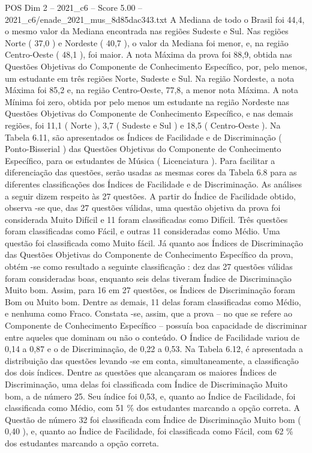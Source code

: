 \begin{textsample}{POS Dim 2 – 2021\_c6 – Score 5.00 – 2021\_c6/enade\_2021\_mus\_8d85dac343.txt}
A Mediana de todo o Brasil foi 44,4, o mesmo valor da Mediana encontrada nas regiões Sudeste e Sul.
Nas regiões Norte ( 37,0 ) e Nordeste ( 40,7 ), o valor da Mediana foi menor, e, na região Centro-Oeste ( 48,1 ), foi maior.
A nota Máxima da prova foi 88,9, obtida nas Questões Objetivas do Componente de Conhecimento Específico, por, pelo menos, um estudante em três regiões Norte, Sudeste e Sul.
Na região Nordeste, a nota Máxima foi 85,2 e, na região Centro-Oeste, 77,8, a menor nota Máxima.
A nota Mínima foi zero, obtida por pelo menos um estudante na região Nordeste nas Questões Objetivas do Componente de Conhecimento Específico, e nas demais regiões, foi 11,1 ( Norte ), 3,7 ( Sudeste e Sul ) e 18,5 ( Centro-Oeste ).
Na Tabela 6.11, são apresentados os Índices de Facilidade e de Discriminação ( Ponto-Bisserial ) das Questões Objetivas do Componente de Conhecimento Específico, para os estudantes de Música ( Licenciatura ).
Para facilitar a diferenciação das questões, serão usadas as mesmas cores da Tabela 6.8 para as diferentes classificações dos Índices de Facilidade e de Discriminação.
As análises a seguir dizem respeito às 27 questões.
A partir do Índice de Facilidade obtido, observa -se que, das 27 questões válidas, uma questão objetiva da prova foi considerada Muito Difícil e 11 foram classificadas como Difícil.
Três questões foram classificadas como Fácil, e outras 11 consideradas como Médio.
Uma questão foi classificada como Muito fácil.
Já quanto aos Índices de Discriminação das Questões Objetivas do Componente de Conhecimento Específico da prova, obtém -se como resultado a seguinte classificação : dez das 27 questões válidas foram consideradas boas, enquanto seis delas tiveram Índice de Discriminação Muito bom.
Assim, para 16 em 27 questões, os Índices de Discriminação foram Bom ou Muito bom.
Dentre as demais, 11 delas foram classificadas como Médio, e nenhuma como Fraco.
Constata -se, assim, que a prova – no que se refere ao Componente de Conhecimento Específico – possuía boa capacidade de discriminar entre aqueles que dominam ou não o conteúdo.
O Índice de Facilidade variou de 0,14 a 0,87 e o de Discriminação, de 0,22 a 0,53.
Na Tabela 6.12, é apresentada a distribuição das questões levando -se em conta, simultaneamente, a classificação dos dois índices.
Dentre as questões que alcançaram os maiores Índices de Discriminação, uma delas foi classificada com Índice de Discriminação Muito bom, a de número 25.
Seu índice foi 0,53, e, quanto ao Índice de Facilidade, foi classificada como Médio, com 51 \% dos estudantes marcando a opção correta.
A Questão de número 32 foi classificada com Índice de Discriminação Muito bom ( 0,40 ), e, quanto ao Índice de Facilidade, foi classificada como Fácil, com 62 \% dos estudantes marcando a opção correta.

\end{textsample}
